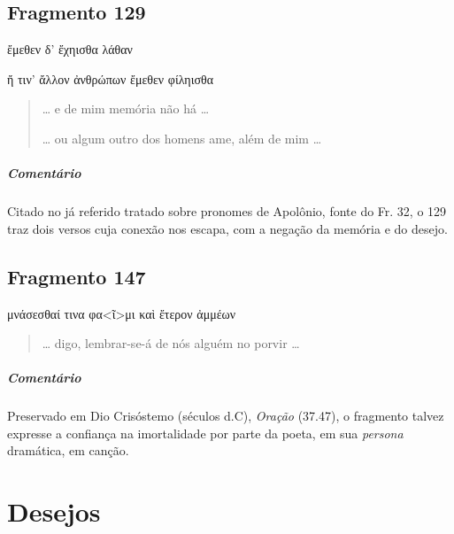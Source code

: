 {\pagebreak
\section{Fragmento 129}

\begin{gkverse}
ἔμεθεν δ’ ἔχηισθα λάθαν

\ast\quad\ast\quad\ast

ἤ τιν’ ἄλλον ἀνθρώπων ἔμεθεν φίληισθα

\end{gkverse}

\begin{verse}
\ldots{} e de mim memória não há \ldots{}

\ast\quad\ast\quad\ast

\ldots{} ou algum outro dos homens ame, além de mim \ldots{}
\end{verse}

\paragraph{Comentário}
Citado no já referido tratado sobre pronomes de Apolônio, fonte do Fr. 32, o 129 traz dois versos cuja conexão nos escapa, com a negação da memória e do desejo.


\section{Fragmento 147}

\begin{gkverse}
μνάσεσθαί τινα φα<ῖ>μι \dagger{}καὶ ἔτερον\dagger{} ἀμμέων
\end{gkverse}

\begin{verse}
\ldots{} digo, lembrar-se-á de nós alguém no porvir \ldots{}
\end{verse}

{\paragraph{Comentário} Preservado em Dio Crisóstemo (séculos  d.C), \textit{Oração} (37.47), o fragmento talvez expresse a confiança na imortalidade por parte da poeta, em sua \textit{persona} dramática, em canção.}


\chapter{Desejos}

}
